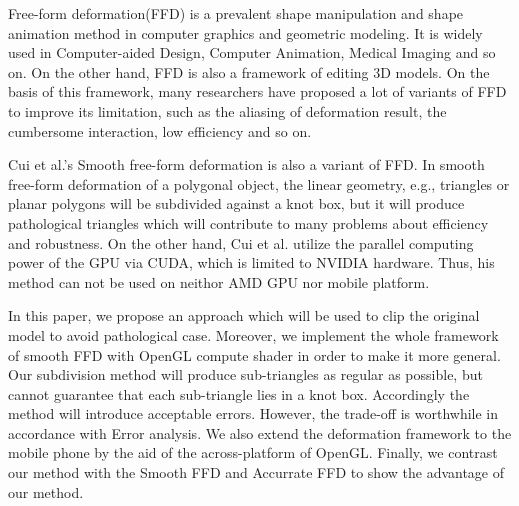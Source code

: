 

\begin{eabstract}
    Free-form deformation\cite{Sederberg86}(FFD) is a prevalent shape manipulation and shape animation method in computer graphics and geometric modeling. It is widely used in Computer-aided Design, Computer Animation, Medical Imaging and so on. On the other hand, FFD is also a framework of editing 3D models. On the basis of this framework, many researchers have proposed a lot of variants of FFD to improve its limitation, such as the aliasing of deformation result, the cumbersome interaction, low efficiency and so on.

    Cui et al.'s Smooth free-form deformation\cite{Cui15} is also a variant of FFD. In smooth free-form deformation\cite{Cui15} of a polygonal object, the linear geometry, e.g., triangles or planar polygons will be subdivided against a knot box, but it will produce pathological triangles which will contribute to many problems about efficiency and robustness. On the other hand, Cui et al. utilize the parallel computing power of the GPU via CUDA, which is limited to NVIDIA hardware. Thus, his method can not be used on neithor AMD GPU nor mobile platform. 

    In this paper, we propose an approach which will be used to clip the original model to avoid pathological case. Moreover, we implement the whole framework of smooth FFD with OpenGL compute shader in order to make it more general. Our subdivision method will produce sub-triangles as regular as possible, but cannot guarantee that each sub-triangle lies in a knot box. Accordingly the method will introduce acceptable errors. However, the trade-off is worthwhile in accordance with Error analysis. We also extend the deformation framework to the mobile phone by the aid of the across-platform of OpenGL. Finally, we contrast our method with the Smooth FFD and Accurrate FFD to show the advantage of our method.
\end{eabstract}

